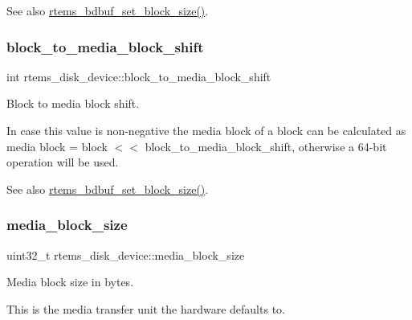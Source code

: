 \begin{DoxySeeAlso}{See also}
\mbox{\hyperlink{group__rtems__bdbuf_ga649b3b4fb368921f579a0204552a7a60}{rtems\+\_\+bdbuf\+\_\+set\+\_\+block\+\_\+size()}}. 
\end{DoxySeeAlso}
\mbox{\label{structrtems__disk__device_ae73934f4f4c98238e99b5d0240933544}} 
\subsubsection{\texorpdfstring{block\_to\_media\_block\_shift}{block\_to\_media\_block\_shift}}
{\footnotesize\ttfamily int rtems\+\_\+disk\+\_\+device\+::block\+\_\+to\+\_\+media\+\_\+block\+\_\+shift}



Block to media block shift. 

In case this value is non-\/negative the media block of a block can be calculated as media block = block $<$$<$ block\+\_\+to\+\_\+media\+\_\+block\+\_\+shift, otherwise a 64-\/bit operation will be used.

\begin{DoxySeeAlso}{See also}
\mbox{\hyperlink{group__rtems__bdbuf_ga649b3b4fb368921f579a0204552a7a60}{rtems\+\_\+bdbuf\+\_\+set\+\_\+block\+\_\+size()}}. 
\end{DoxySeeAlso}
\mbox{\label{structrtems__disk__device_a1f446627e8cc11b5ce75d90aa8ad6c92}} 
\subsubsection{\texorpdfstring{media\_block\_size}{media\_block\_size}}
{\footnotesize\ttfamily uint32\+\_\+t rtems\+\_\+disk\+\_\+device\+::media\+\_\+block\+\_\+size}



Media block size in bytes. 

This is the media transfer unit the hardware defaults to. \mbox{\label{structrtems__disk__device_ac667c0dbfdf48b6c18a6f90cbe06e160}} 
